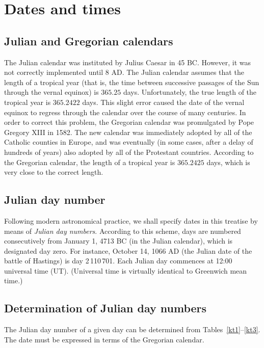 \chapter{Dates and times}

\section{Julian and Gregorian calendars}
The Julian calendar was instituted by Julius Caesar in 45 BC. However, it was not correctly implemented until
8 AD. The Julian calendar assumes that the length of a tropical year (that is, the time between successive passages of the Sun through the vernal equinox) is $365.25$ days. 
Unfortunately, the true length of the tropical year is $365.2422$ days. This slight error caused the date of the vernal equinox to regress through the calendar over the course
of many centuries. In order to correct this problem, the Gregorian calendar was promulgated by Pope Gregory XIII in 1582. The new calendar was immediately adopted by all of the Catholic counties in Europe, and was eventually
(in some cases, after a delay of hundreds of years)
also adopted by all of the Protestant countries. According to the Gregorian calendar, the length of a tropical year is $365.2425$ days, which is very close to the correct length. 

\section{Julian day number}
Following modern astronomical practice, we shall specify dates  in this treatise 
by means of {\em Julian day numbers}. According to this
scheme, days are numbered consecutively from January 1, 4713 BC (in the Julian calendar), which
is designated day zero. For instance, October 14, 1066 AD (the Julian date of the battle of Hastings) is
day 2\,110\,701. Each Julian day commences at 12:00 universal time (UT). (Universal time is virtually identical to
Greenwich mean time.)

\section{Determination of Julian day numbers}
The Julian day number of a given day can be determined from Tables~\ref{kt1}--\ref{kt3}.  The
date must be expressed in terms of the Gregorian calendar. 

